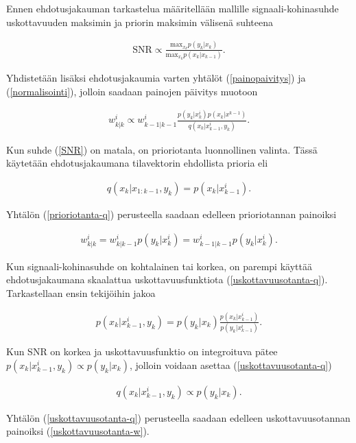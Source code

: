 \documentclass[
  12pt,
  a4paper, twoside]{book}
\begin{document}
Ennen ehdotusjakauman tarkastelua määritellään mallille signaali-kohinasuhde uskottavuuden maksimin ja priorin maksimin välisenä suhteena

\begin{align}\label{SNR}
\text{SNR}\propto \frac{\text{max}_{x_k}p(y_k|x_k)}{\text{max}_{x_k}p(x_k|x_{k-1})}. 
\end{align}

\noindent Yhdistetään lisäksi ehdotusjakaumia varten yhtälöt (\ref{painopaivitys}) ja (\ref{normalisointi}), jolloin saadaan painojen päivitys muotoon

\begin{align}\label{painopaivitys-propto}
w^i_{k|k} \propto w^i_{k-1|k-1}\frac{p(y_k|x^i_k)p(x_k|x^{k-1})}{q(x_k|x^i_{k-1},y_k)}.
\end{align}

Kun suhde (\ref{SNR}) on matala, on prioriotanta luonnollinen valinta. Tässä käytetään ehdotusjakaumana tilavektorin ehdollista prioria eli

\begin{align}\label{prioriotanta-q}
q(x_k|x_{1:k-1},y_{k})=p(x_k|x^i_{k-1}).
\end{align}

\noindent Yhtälön (\ref{prioriotanta-q}) perusteella saadaan edelleen prioriotannan painoiksi

\begin{align}\label{prioriotanta-w}
w^i_{k|k} = w^i_{k|k-1}p(y_k|x^i_k) = w^i_{k-1|k-1}p(y_k|x^i_k).
\end{align}

Kun signaali-kohinasuhde on kohtalainen tai korkea, on parempi käyttää ehdotusjakaumana skaalattua uskottavuusfunktiota (\ref{uskottavuusotanta-q}). Tarkastellaan ensin tekijöihin jakoa

\begin{align}\label{uskottavuusotanta-factorization}
p(x_k|x^i_{k-1},y_k)=p(y_k|x_k)\frac{p(x_k|x^i_{k-1})}{p(y_k|x^i_{k-1})}.
\end{align}

\noindent Kun SNR on korkea ja uskottavuusfunktio on integroituva pätee \(p(x_k|x^i_{k-1},y_{k}) \propto p(y_k|x_k)\), jolloin voidaan asettaa (\ref{uskottavuusotanta-q})

\begin{align}\label{uskottavuusotanta-q}
q(x_k|x^i_{k-1},y_{k}) \propto p(y_k|x_k).
\end{align}

\noindent Yhtälön (\ref{uskottavuusotanta-q}) perusteella saadaan edelleen uskottavuusotannan painoiksi (\ref{uskottavuusotanta-w}).
\end{document}
